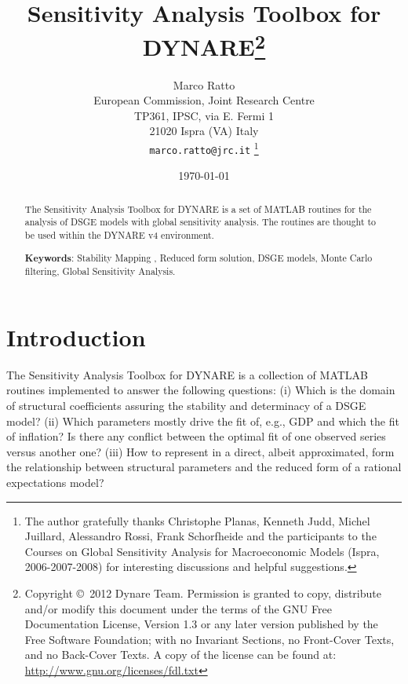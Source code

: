 \documentclass[12pt,a4paper]{article}
\begin{document}
\title{Sensitivity Analysis Toolbox for DYNARE\thanks{Copyright \copyright~2012 Dynare
    Team. Permission is granted to copy, distribute and/or modify
    this document under the terms of the GNU Free Documentation
    License, Version 1.3 or any later version published by the Free
    Software Foundation; with no Invariant Sections, no Front-Cover
    Texts, and no Back-Cover Texts. A copy of the license can be found
    at: \url{http://www.gnu.org/licenses/fdl.txt}}}

\author{Marco Ratto\\
European Commission, Joint Research Centre \\
TP361, IPSC, via E. Fermi 1\\21020 Ispra
(VA) Italy\\
\texttt{marco.ratto@jrc.it}
\thanks{The author gratefully thanks Christophe Planas, Kenneth Judd, Michel Juillard,
Alessandro Rossi, Frank Schorfheide and the participants to the
Courses on Global Sensitivity Analysis for Macroeconomic
Models (Ispra, 2006-2007-2008) for interesting discussions and
helpful suggestions.}}

\date{\today}
\maketitle %


\begin{abstract}
\noindent The Sensitivity Analysis Toolbox for DYNARE is a set of
MATLAB routines for the analysis of DSGE models with global
sensitivity analysis. The routines are thought to be used within
the DYNARE v4 environment.


\begin{description}
  \item \textbf{Keywords}: Stability Mapping , Reduced form solution, DSGE models,
  Monte Carlo filtering,   Global Sensitivity Analysis.
\end{description}
\end{abstract}
\newpage
\section{Introduction} \label{s:intro}
The Sensitivity Analysis Toolbox for DYNARE is a collection of
MATLAB routines implemented to answer the following questions: (i)
Which is the domain of structural coefficients assuring the
stability and determinacy of a DSGE model? (ii) Which parameters
mostly drive the fit of, e.g., GDP and which the fit of inflation?
Is there any conflict between the optimal fit of one observed
series versus another one? (iii) How to represent in a direct,
albeit approximated, form the relationship between structural
parameters and the reduced form of a rational expectations model?
\end{document}
